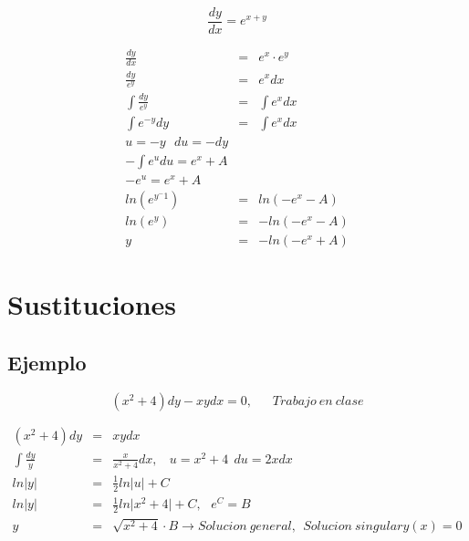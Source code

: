\documentclass{article}
\begin{document}
\begin{equation}
\frac{dy}{dx} = e^{x+y}
\end{equation}

\begin{eqnarray}
\nonumber \frac{dy}{dx} &=& e^x \cdot e^y \\
\nonumber \frac{dy}{e^y} &=& e^x dx \\
\nonumber \int \frac{dy}{e^y} &=& \int e^x dx \\
\nonumber \int e^{-y} dy &=& \int e^x dx \\
\nonumber u = -y \ \ \ du = -dy & & \\
\nonumber - \int e^u du = e^x + A \\
\nonumber -e^u = e^x + A \\
\nonumber ln \left(e^{y^-1} \right) &=& ln \left( -e^x - A \right) \\
\nonumber ln \left(e^{y} \right) &=& - ln \left( -e^x - A \right) \\
\nonumber y &=& -ln \left( -e^x + A \right)  
\end{eqnarray}

\section{Sustituciones}

\subsection{Ejemplo}

\begin{equation}
\left( x^2 + 4 \right) dy  - xydx  = 0, \ \ \ \ \ \ \ Trabajo \  en \ clase
\end{equation}


\begin{center}

\begin{eqnarray}
\nonumber \left( x^2 + 4 \right) dy  &=& xydx \\
\nonumber \int \frac{dy}{y} &=& \frac{x}{x^2+4} dx, \ \ \ \  u = x^2 +4 \ \ du = 2xdx \\
\nonumber ln \lvert y \rvert &=& \frac{1}{2} ln \lvert u \rvert + C \\
\nonumber ln \lvert y \rvert &=& \frac{1}{2} ln \lvert x^2 + 4 \rvert  + C ,  \ \ \ e^C = B \\
\nonumber y &=& \sqrt{x^2 + 4} \cdot B \rightarrow Solucion \ general, \ \  Solucion \  singular y\left( x \right) = 0 \\ 
\end{eqnarray}
\end{center}
\end{document}
